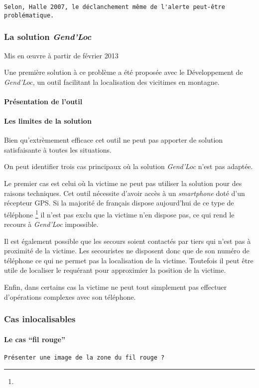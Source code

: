 \begin{verbatim}
Selon, Halle 2007, le déclanchement même de l'alerte peut-être
problématique. 
\end{verbatim}

\subsubsection{La solution \emph{Gend'Loc}}
\label{subsec:1-1-2-1}

Mis en œuvre à partir de février 2013

Une première solution à ce problème a été proposée avec le
Développement de \emph{Gend'Loc,} un outil facilitant la localisation
des vicitimes en montagne.

\paragraph{Présentation de l'outil}

\paragraph{Les limites de la solution}

Bien qu'extrèmement efficace cet outil ne peut pas apporter de
solution satisfaisante à toutes les situations.

On peut identifier trois cas principaux où la solution \emph{Gend'Loc}
n'est pas adaptée.

Le premier cas est celui où la victime ne peut pas utiliser la
solution pour des raisons techniques. Cet outil nécessite d'avoir
accès à un \emph{smartphone} doté d'un récepteur GPS. Si la majorité
de français dispose aujourd'hui de ce type de
téléphone \footnote{} il n'est pas
exclu que la victime n'en dispose pas, ce qui rend le recours à
\emph{Gend'Loc} impossible.

Il est également possible que les secours soient contactés par tiers
qui n'est pas à proximité de la victime. Les secouristes ne disposent
donc que de son numéro de téléphone ce qui ne permet pas la
localisation de la victime. Toutefois il peut être utile de localiser
le requérant pour approximier la position de la victime.

Enfin, dans certains cas la victime ne peut tout simplement pas
effectuer d'opérations complexes avec son téléphone.


\subsubsection{Cas inlocalisables}
\label{subsec:1-1-2-2}

\paragraph{Le cas \enquote{fil rouge}}

\texttt{Présenter une image de la zone du fil rouge ?}

